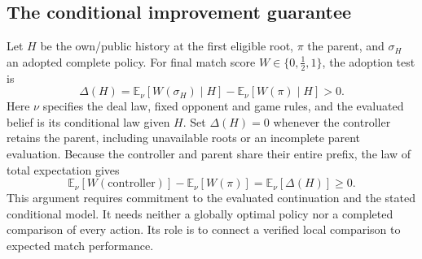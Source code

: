 \subsection{The conditional improvement guarantee}
Let $H$ be the own/public history at the first eligible root, $\pi$ the parent,
and $\sigma_H$ an adopted complete policy. For final match score
$W\in\{0,\tfrac12,1\}$, the adoption test is
\[
  \Delta(H)
  = \mathbb{E}_{\nu}[W(\sigma_H)\mid H]
    -\mathbb{E}_{\nu}[W(\pi)\mid H] > 0.
\]
Here $\nu$ specifies the deal law, fixed opponent and game rules, and the
evaluated belief is its conditional law given $H$. Set $\Delta(H)=0$ whenever
the controller retains the parent, including unavailable roots or an incomplete
parent evaluation. Because the controller and parent share their entire prefix,
the law of total expectation gives
\[
  \mathbb{E}_{\nu}[W(\mathrm{controller})]
  -\mathbb{E}_{\nu}[W(\pi)]
  =\mathbb{E}_{\nu}[\Delta(H)]\geq 0.
\]
This argument requires commitment to the evaluated continuation and the stated
conditional model. It needs neither a globally optimal policy nor a completed
comparison of every action. Its role is to connect a verified local comparison
to expected match performance.



